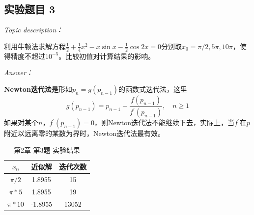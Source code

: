 \documentclass[12pt]{ctexart}
\begin{document}
	\subsection{实验题目 3}
	\textit{Topic description：}
	
	利用牛顿法求解方程$\frac{1}{2}+\frac{1}{4}x^2-x\sin x-\frac{1}{2}\cos 2x=0$分别取$x_0=\pi/2,5\pi,10\pi$，使得精度不超过$10^{-5}$。比较初值对计算结果的影响。
	
	\textit{Answer：}
	
	\textbf{Newton迭代法}是形如$p_n=g(p_{n-1})$的函数式迭代法，这里$$g(p_{n-1})=p_{n-1}-\frac{f(p_{n-1})}{f^{'}(p_{n-1})},\quad n\geq 1$$如果对某个$n$，$f^{'}(p_{n-1})=0$，则Newton迭代法不能继续下去，实际上，当$f^{'}$在$p$附近以远离零的某数为界时，Newton迭代法最有效。
	
	\begin{table}[htbp]
		\centering
		\caption{第2章 第3题 实验结果}
		\begin{tabular}
			{c|c|c}
			\hline
			$x_0$&近似解&迭代次数 \\
			\hline
			$\pi/2$&1.8955&15 \\
			\hline
			$\pi*5$&1.8955&19 \\
			\hline
			$\pi*10$&-1.8955&13052 \\
			\hline
		\end{tabular}
	\end{table}
	
\end{document}

